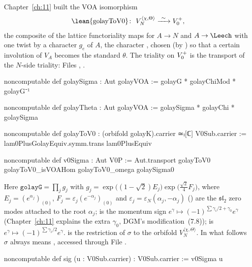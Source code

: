 Chapter~\ref{ch:11} built the VOA isomorphism
\begin{equation*}
  \text{\lean{golayToV0}}\colon\ V_N^{\langle\chi,\Theta\rangle}\xrightarrow{\ \sim\ }\chthirteenV,
\end{equation*}
the composite of the lattice functoriality maps for $A\to N$ and $A\to\Leech$ with one twist by a
character $g_e$ of $A$, the character , chosen (by ) so that a
certain involution of $V_A$ becomes the standard $\theta$. The triality on $V_0^{+}$ is the
transport of the $N$-side triality:
\noindent Files , .
\begin{leancode}
noncomputable def golaySigma : Aut golayVOA := golayG * golayChiMod * golayG⁻¹

noncomputable def golayTheta : Aut golayVOA := golaySigma * golayChi * golaySigma

noncomputable def golayToV0 : (orbifold golayK).carrier ≃ₗ[ℂ] V0Sub.carrier :=
  lam0PlusGolayEquiv.symm.trans lam0PlusEquiv

noncomputable def v0Sigma : Aut V0P :=
  Aut.transport golayToV0 golayToV0_isVOAHom golayToV0_omega golaySigma0
\end{leancode}
Here $\mathtt{golayG}=\prod_j g_j$ with $g_j=\exp\bigl((1-\sqrt2)E_j\bigr)\exp\bigl(\tfrac{\sqrt2}{4}F_j\bigr)$, where
$E_j=(e^{\alpha_j})_{(0)}$, $F_j=\varepsilon_j(e^{-\alpha_j})_{(0)}$ and
$\varepsilon_j=\varepsilon_N(\alpha_j,-\alpha_j)$ () are the $\mathfrak{sl}_2$ zero modes
attached to the root $\alpha_j$;  is the momentum sign
$e^\gamma\mapsto(-1)^{\sum\gamma_i/2+\gamma_0}e^\gamma$ (Chapter~\ref{ch:11} explains the extra
$\gamma_0$, DGM's modification~(7.8));  is $e^\gamma\mapsto(-1)^{\sum\gamma_i/2}e^\gamma$.
 is the restriction of $\sigma$ to the orbifold $V_N^{\langle\chi,\Theta\rangle}$.
In what follows $\sigma$ always means , accessed through
\noindent File .
\begin{leancode}
noncomputable def sig (u : V0Sub.carrier) : V0Sub.carrier := v0Sigma u
\end{leancode}

